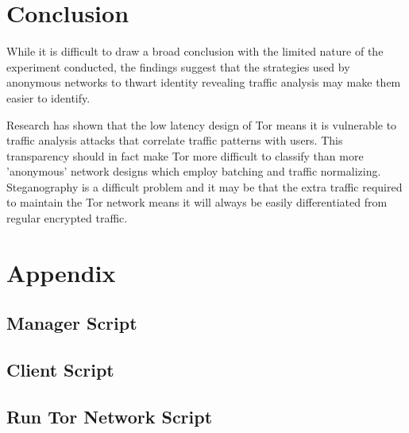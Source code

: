 \documentclass{ecuthesis}
\begin{document}
\chapter{Conclusion}

While it is difficult to draw a broad conclusion with the limited nature of the
experiment conducted, the findings suggest that the strategies used by anonymous
networks to thwart identity revealing traffic analysis may make them easier to
identify.

Research has shown that the low latency design of Tor means it is vulnerable to
traffic analysis attacks that correlate traffic patterns with users. This
transparency should in fact make Tor more difficult to classify than more
'anonymous' network designs which employ batching and traffic normalizing.
Steganography is a difficult problem and it may be that the extra traffic
required to maintain the Tor network means it will always be easily
differentiated from regular encrypted traffic.

\chapter{Appendix}

\section{Manager Script}



\section{Client Script}



\section{Run Tor Network Script}



\printbibliography[title=REFERENCES]
\end{document}
